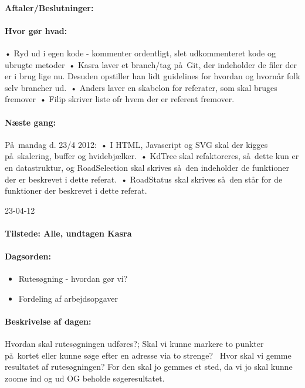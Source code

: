 \documentclass[a4paper,10pt,titlepage]{article}
\begin{document}
		\paragraph{Aftaler/Beslutninger:}
		
		\paragraph{Hvor g\o r hvad:}
		•	Ryd ud i egen kode - kommenter ordentligt, slet udkommenteret kode og ubrugte metoder\
•	Kasra laver et branch/tag p\aa \ Git, der indeholder de filer der er i brug lige nu. Desuden opstiller han lidt guidelines for hvordan og hvorn\aa r folk selv brancher ud.\
•	Anders laver en skabelon for referater, som skal bruges fremover\
•	Filip skriver liste ofr hvem der er referent fremover.


		\paragraph{N\ae ste gang:}
P\aa \ mandag d. 23/4 2012:\
•	I HTML, Javascript og SVG skal der kigges p\aa \ skalering, buffer og hvidebj\ae lker.\
•	KdTree skal refaktoreres, s\aa \ dette kun er en datastruktur, og RoadSelection skal skrives s\aa \ den indeholder de funktioner der er beskrevet i dette referat.\
•	RoadStatus skal skrives s\aa \ den st\aa r for de funktioner der beskrevet i dette referat.\mbox{}\\

\begin{center}
		23-04-12
		\end{center}
		
		\paragraph{Tilstede: Alle, undtagen Kasra}
		\paragraph{Dagsorden:}
		\begin{itemize}
					\item Rutes\o gning - hvordan g\o r vi?
					\item Fordeling af arbejdsopgaver
		\end{itemize}
		
		\paragraph{Beskrivelse af dagen:}
		Hvordan skal rutes\o gningen udf\o res?; Skal vi kunne markere to punkter p\aa \  kortet eller kunne s\o ge efter en adresse via to strenge? \
Hvor skal vi gemme resultatet af rutes\o gningen? For den skal jo gemmes et sted, da vi jo skal kunne zoome ind og ud OG beholde s\o geresultatet.  
\end{document}
